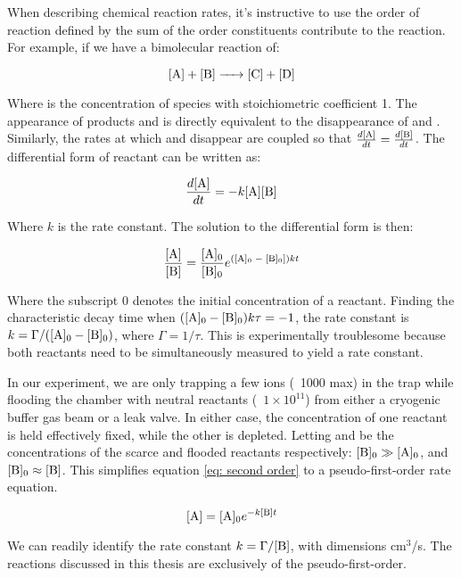 When describing chemical reaction rates, it's instructive to use the order of reaction defined by the sum of the order constituents contribute to the reaction. For example, if we have a bimolecular reaction of:

\begin{equation*}
	\ce{[A] + [B] -> [C] + [D]}
\end{equation*}

Where \ce{[X]} is the concentration of species  with stoichiometric coefficient 1. The appearance of products \ce{[C]} and \ce{[D]} is directly equivalent to the disappearance of \ce{[A]} and \ce{[B]}. Similarly, the rates at which \ce{[A]} and \ce{[B]} disappear are coupled so that $\frac{d \ce{[A]}}{dt} = \frac{d \ce{[B]}}{dt}$. The differential form of reactant \ce{[A]} can be written as:

\begin{equation*}
	\frac{d \ce{[A]}}{dt} = -k \ce{[A]}\ce{[B]}
\end{equation*}

Where $k$ is the rate constant. The solution to the differential form is then:

\begin{equation*}
	\frac{\ce{[A]}}{\ce{[B]}} = \frac{\ce{[A]0}}{\ce{[B]0}}e^{(\ce{[A]0 - [B]0}])kt}
	\label{eq: second order}
\end{equation*}

Where the subscript $0$ denotes the initial concentration of a reactant. Finding the characteristic decay time when $(\ce{[A]0 - [B]0})k\tau = -1$, the rate constant is $k=\Gamma/(\ce{[A]0 - [B]0})$, where $\Gamma=1/\tau$. This is experimentally troublesome because both reactants need to be simultaneously measured to yield a rate constant.

In our experiment, we are only trapping a few ions (~1000 max) in the trap while flooding the chamber with neutral reactants (~$1 \times 10^11$) from either a cryogenic buffer gas beam or a leak valve. In either case, the concentration of one reactant is held effectively fixed, while the other is depleted. Letting \ce{[A]} and \ce{[B]} be the concentrations of the scarce and flooded reactants respectively: $\ce{[B]0} \gg \ce{[A]0}$, and $\ce{[B]0} \approx \ce{[B]}$. This simplifies equation \ref{eq: second order} to a pseudo-first-order rate equation.

\begin{equation*}
	\ce{[A]} = \ce{[A]0}e^{-k\ce{[B]}t}
\end{equation*}

We can readily identify the rate constant $k=\Gamma/\ce{[B]}$, with dimensions cm$^3$/s. The reactions discussed in this thesis are exclusively of the pseudo-first-order.

